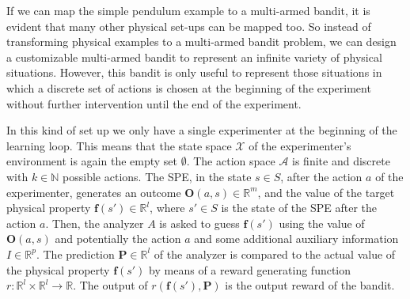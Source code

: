 \documentclass[11pt,a4paper,twoside]{report}
\newcommand{\+}{\textnormal{+} }
\theoremstyle{definition}
\numberwithin{equation}{chapter}
\begin{document}
\par If we can map the simple pendulum example to a multi-armed bandit, it is
evident that many other physical set-ups can be mapped too. So instead of
transforming physical examples to a multi-armed bandit problem, we can design a
customizable multi-armed bandit to represent an infinite variety of physical
situations. However, this bandit is only useful to represent those situations
in which a discrete set of actions is chosen at the beginning of the experiment
without further intervention until the end of the experiment.

In this kind of set up we only have a single experimenter at the beginning of
the learning loop. This means that the state space $\mathcal{X}$  of the
experimenter's environment is again the empty set $\emptyset$. The action space
$\mathcal{A}$ is finite and discrete with $k \in \mathbb{N}$ possible actions.
The SPE, in the state $s \in S$, after the action $a$ of the experimenter,
generates an outcome $\textbf{O}(a,s) \in \mathbb{R}^m$, and the value of the
target physical property $\textbf{f}(s') \in \mathbb{R}^l$, where $s' \in S$ is
the state of the SPE after the action $a$. Then, the analyzer $A$ is asked to
guess $\textbf{f}(s')$ using the value of $\textbf{O}(a,s)$ and potentially the
action $a$ and some additional auxiliary information $I \in  \mathbb{R}^{p}$.
The prediction $\textbf{P} \in \mathbb{R}^l$ of the analyzer is compared to the
actual value of the physical property $\textbf{f}(s')$ by means of a reward
generating function $r:\mathbb{R}^l\times\mathbb{R}^l\rightarrow\mathbb{R}$. The
output of $r(\textbf{f}(s'),\textbf{P})$ is the output reward of the bandit.

\end{document}
